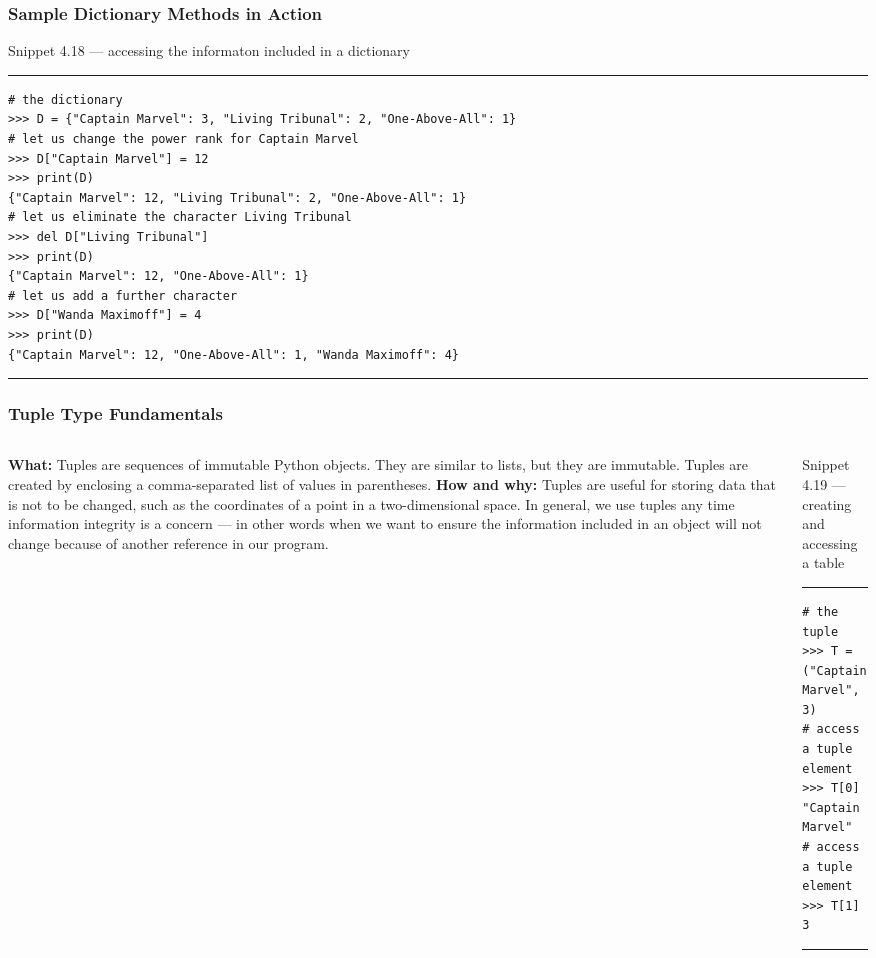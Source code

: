 \documentclass[aspectratio=1610]{beamer}
\begin{document}
\begin{frame}[fragile]
    \frametitle{Sample Dictionary Methods in Action}
    Snippet 4.18 --- accessing the informaton included in a dictionary
    \rule{\textwidth}{1pt}
    \scriptsize
    \begin{verbatim}
# the dictionary 
>>> D = {"Captain Marvel": 3, "Living Tribunal": 2, "One-Above-All": 1}
# let us change the power rank for Captain Marvel
>>> D["Captain Marvel"] = 12
>>> print(D)
{"Captain Marvel": 12, "Living Tribunal": 2, "One-Above-All": 1}
# let us eliminate the character Living Tribunal 
>>> del D["Living Tribunal"]
>>> print(D)
{"Captain Marvel": 12, "One-Above-All": 1}
# let us add a further character 
>>> D["Wanda Maximoff"] = 4
>>> print(D)
{"Captain Marvel": 12, "One-Above-All": 1, "Wanda Maximoff": 4}
    \end{verbatim}
    \rule{\textwidth}{1pt}
\end{frame}
\begin{frame}[fragile]
    \frametitle{Tuple Type Fundamentals}
    \begin{columns}
    \begin{column}{0.45\textwidth}
    \quad \textbf{What:} 
    Tuples are sequences of immutable Python objects. They are similar to lists, but they are immutable. Tuples are created by enclosing a comma-separated list of values in parentheses.
    \vspace{1em}
    \quad \textbf{How and why:}
    Tuples are useful for storing data that is not to be changed, such as the coordinates of a point in a two-dimensional space. In general, we use tuples any time information integrity is a concern --- in other words when we want to ensure the information included in an object will not change because of another reference in our program.
    \end{column}
    \begin{column}{0.5\textwidth}
    \normalsize Snippet 4.19 --- creating and accessing a table 
    \rule{\textwidth}{1pt}
        \scriptsize
        \begin{verbatim}          
# the tuple
>>> T = ("Captain Marvel", 3)
# access a tuple element
>>> T[0]
"Captain Marvel"
# access a tuple element
>>> T[1]
3
        \end{verbatim}
    \rule{\textwidth}{1pt}
    \end{column}
\end{columns}
\end{frame}
\end{document}
